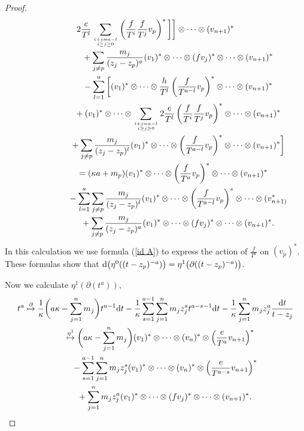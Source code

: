 \begin{proof}
\begin{gather*}
2\frac{e}{T^l}\sum_{i+j=a-l \atop i\geq j\geq 0 } \left(\frac{f}{T^i}\frac{f}{T^j} v_p\right)^*\bigg] \bigg] \otimes\dots\otimes (v_{n+1})^* \nonumber \\
\hphantom{\frac1{(t-z_p)^{a}} \overset{\eta^0}\mapsto}{} + \sum_{j\neq p} \frac{m_j}{(z_j-z_p)^a} (v_1)^* \otimes\dots\otimes (fv_j)^* \otimes\dots\otimes (v_{n+1})^* \nonumber \\
\hphantom{\frac1{(t-z_p)^{a}} \overset{\eta^0}\mapsto}{}
 - \sum_{l=1}^a \bigg[ (v_1)^* \otimes\dots\otimes \frac{h}{T^l}\left(\frac{f}{T^{a-l}}v_p \right)^* \otimes\dots\otimes (v_{n+1})^* \nonumber \\
\hphantom{\frac1{(t-z_p)^{a}} \overset{\eta^0}\mapsto}{} + (v_1)^* \otimes\dots\otimes \sum_{i+j=a-l \atop i\geq j\geq 0} 2\frac{e}{T^l} \left(\frac{f}{T^i}\frac{f}{T^j}v_p\right)^*\otimes\dots\otimes (v_{n+1})^*
\nonumber \\
\hphantom{\frac1{(t-z_p)^{a}} \overset{\eta^0}\mapsto}{} + \sum_{j \neq p} \frac{m_j}{(z_j-z_p)^l} (v_1)^* \otimes\dots\otimes \left(\frac{f}{T^{a-l}} v_p \right)^* \otimes\dots\otimes (v_{n+1})^* \bigg] \nonumber \\
\hphantom{\frac1{(t-z_p)^{a}}}{} = (\kappa a + m_p) (v_1)^* \otimes\dots\otimes\left(\frac{f}{T^a}v_p \right)^* \otimes\dots\otimes (v_{n+1})^* \nonumber \\
\hphantom{\frac1{(t-z_p)^{a}} \overset{\eta^0}\mapsto}{} - \sum_{l=1}^a \sum_{j \neq p} \frac{m_j}{(z_j-z_p)^l} (v_1)^* \otimes\dots\otimes \left(\frac{f}{T^{a-l}} v_p \right)^* \otimes\dots\otimes
(v_{n+1)}^* \nonumber \\
\hphantom{\frac1{(t-z_p)^{a}} \overset{\eta^0}\mapsto}{} + \sum_{j\neq p} \frac{ m_j}{(z_j-z_p)^a} (v_1)^* \otimes\dots\otimes (fv_j)^* \otimes\dots\otimes (v_{n+1})^*.
\end{gather*}
In this calculation we use formula (\ref{id A}) to express the action of $\frac{f}{T^a}$ on $(v_{p})^*$. These formulas show that ${\rm d}\big(\eta^0((t-z_p)^{-a})\big) = \eta^1\big(\partial((t-z_p)^{-a})\big)$.

Now we calculate $\eta^1(\partial(t^a))$,
\begin{gather*}
t^a \overset{\partial}{\mapsto} \frac{1}{\kappa}\bigg(a\kappa - \sum_{j=1}^n m_j\bigg) t^{a-1} {\rm d}t - \frac{1}{\kappa} \sum_{s=1}^{a-1} \sum_{j=1}^n m_j z_j^s
t^{a-s-1} {\rm d}t - \frac{1}{\kappa} \sum_{j=1}^n m_j z_j^a \frac{{\rm d}t}{t-z_j} \nonumber \\
\hphantom{t^a}{} \overset{\eta^1}{\mapsto} \bigg(a\kappa - \sum_{j=1}^n m_j\bigg) (v_1)^* \otimes \dots \otimes (v_n)^* \otimes \left(\frac{e}{T^a} v_{n+1}\right)^*\nonumber \\
\hphantom{t^a \overset{\partial}{\mapsto}}{}- \sum_{s=1}^{a-1} \sum_{j=1}^n m_j z_j^s (v_1)^* \otimes \dots \otimes (v_n)^* \otimes \left(\frac{e}{T^{a-s}} v_{n+1}\right)^* \nonumber \\
\hphantom{t^a \overset{\partial}{\mapsto}}{} + \sum_{j=1}^n m_j z_j^a (v_1)^* \otimes \dots \otimes (f v_j)^* \otimes\dots\otimes (v_{n+1})^*.
\end{gather*}


\end{proof}
